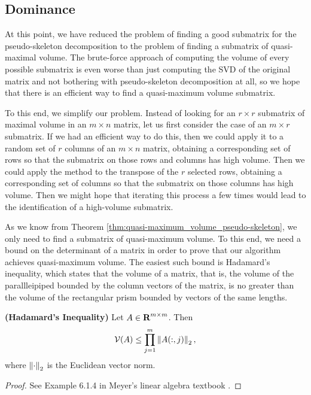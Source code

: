 \documentclass{article}
\begin{document}
	\subsection{Dominance}
	
	At this point, we have reduced the problem of finding a good submatrix for the pseudo-skeleton decomposition to the problem of finding a submatrix of quasi-maximal volume. The brute-force approach of computing the volume of every possible submatrix is even worse than just computing the SVD of the original matrix and not bothering with pseudo-skeleton decomposition at all, so we hope that there is an efficient way to find a quasi-maximum volume submatrix.
	
	To this end, we simplify our problem. Instead of looking for an $r\times r$ submatrix of maximal volume in an $m\times n$ matrix, let us first consider the case of an $m \times r$ submatrix. If we had an efficient way to do this, then we could apply it to a random set of $r$ columns of an $m\times n$ matrix, obtaining a corresponding set of rows so that the submatrix on those rows and columns has high volume. Then we could apply the method to the transpose of the $r$ selected rows, obtaining a corresponding set of columns so that the submatrix on those columns has high volume. Then we might hope that iterating this process a few times would lead to the identification of a high-volume submatrix.
	
	As we know from Theorem \ref{thm:quasi-maximum_volume_pseudo-skeleton}, we only need to find a submatrix of quasi-maximum volume. To this end, we need a bound on the determinant of a matrix in order to prove that our algorithm achieves quasi-maximum volume. The easiest such bound is Hadamard's inequality, which states that the volume of a matrix, that is, the volume of the parallleipiped bounded by the column vectors of the matrix, is no greater than the volume of the rectangular prism bounded by vectors of the same lengths.
	
	\begin{lem} \textnormal{\bf(Hadamard's Inequality)}
		\label{lem:hadamard_inequality}
		Let $A \in \textnormal{\bf R}^{m\times m}$. Then
		\begin{equation}
			\label{eq:hadamard_inequality}
			\mathcal{V}(A) \le \prod_{j=1}^m\left\lVert A(:, j) \right\rVert_2,
		\end{equation}
		where $\left\lVert \cdot \right\rVert_2$ is the Euclidean vector norm.
	\end{lem}
	\begin{proof}
		See Example 6.1.4 in Meyer's linear algebra textbook \cite{meyer_2008}.
	\end{proof}
	
\end{document}
